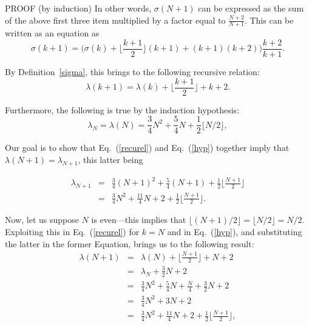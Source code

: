 \documentclass{elsart}
\newcommand{\floor}[1]{{\lfloor{#1}\rfloor}}
\begin{document}
\begin{pf*}{PROOF (by induction)}
In other words, $\sigma(N+1)$ can be expressed as the sum of the above
first three item multiplied by a factor equal to $\frac{N+2}{N+1}$.
This can be written as an equation as
\begin{equation}\label{left}
\sigma(k+1)= \bigl( \sigma(k) + \floor{\frac{k+1}2}(k+1) + (k+1)(k+2) \bigr)
\frac{k+2}{k+1}.
\end{equation}

By Definition~\ref{sigma}, this brings to the following recursive relation:
\begin{equation}\label{recurel}
\lambda(k+1) = \lambda(k) + \floor{\frac{k+1}2} + k + 2.
\end{equation}

Furthermore, the following is true by the induction hypothesis:
\begin{equation}\label{hyp}
\lambda_N = \lambda(N) = \frac34N^2 + \frac54N + \frac12 \floor{N/2},
\end{equation}

Our goal is to show that Eq.~(\ref{recurel}) and Eq.~(\ref{hyp})
together imply that $\lambda(N+1)=\lambda_{N+1}$, this latter being

\begin{eqnarray}\label{th1}
\lambda_{N+1} & = & \frac34(N+1)^2 + \frac54(N+1) + \frac12 \floor{\frac{N+1}{2}} \\
 \label{th2}  & = & \frac34N^2 + \frac{11}4N + 2 +  \frac12 \floor{\frac{N+1}{2}}.
\end{eqnarray}

Now, let us suppose $N$ is even---this implies that
$\floor{(N+1)/2} = \floor{N/2} = N/2$.
Exploiting this in Eq.~(\ref{recurel}) for $k=N$ and in Eq.~(\ref{hyp}), and
substituting the latter in the former Equation, brings us
to the following result:
\begin{eqnarray}
\lambda(N+1) &=& \lambda(N) + \floor{\frac{N+1}{2}} + N + 2 \nonumber\\
             &=& \lambda_N + \frac32N + 2 \nonumber\\
             &=& \frac34N^2 + \frac54N + \frac{N}4 + \frac32N + 2 \nonumber\\
             &=& \frac34N^2 + 3N + 2 \nonumber\\
             &=& \frac34N^2 + \frac{11}4N + 2 + \frac12 \floor{\frac{N+1}{2}},\nonumber
\end{eqnarray}


\end{pf*}
\end{document}
